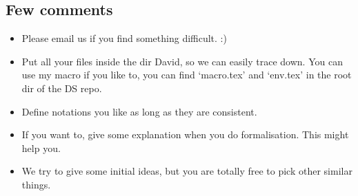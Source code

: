 \subsection{Few comments}
\begin{itemize}
    \item Please email us if you find something difficult. :)
    \item Put all your files inside the dir David, so we can easily trace down. You can use my macro if you like to, you can find `macro.tex' and `env.tex' in the root dir of the DS repo.
    \item Define notations you like as long as they are consistent.
    \item If you want to, give some explanation when you do formalisation. This might help you.
    \item We try to give some initial ideas, but you are totally free to pick other similar things.
\end{itemize}
